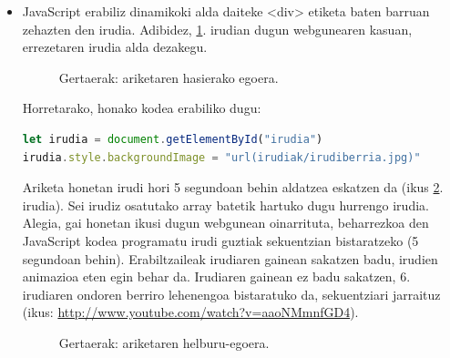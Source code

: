 \begin{itemize}
    \item JavaScript erabiliz dinamikoki alda daiteke <div> etiketa baten barruan zehazten den irudia. Adibidez, \ref{fig:gertaerak-ariketa-1}. irudian dugun webgunearen kasuan, errezetaren irudia alda dezakegu.
    
    \begin{figure}[ht]
	\centering
{}
\caption{Gertaerak: ariketaren hasierako egoera.}
\label{fig:gertaerak-ariketa-1}
\end{figure}

Horretarako, honako kodea erabiliko dugu:

\begin{lstlisting}[language=JavaScript,numbers=none]
let irudia = document.getElementById("irudia")
irudia.style.backgroundImage = "url(irudiak/irudiberria.jpg)"
\end{lstlisting}

Ariketa honetan irudi hori 5 segundoan behin aldatzea  eskatzen da (ikus \ref{fig:gertaerak-ariketa-2}. irudia). Sei irudiz osatutako array batetik hartuko dugu hurrengo irudia. Alegia, gai honetan ikusi dugun webgunean oinarrituta, beharrezkoa den JavaScript kodea programatu irudi guztiak sekuentzian bistaratzeko (5 segundoan behin). Erabiltzaileak irudiaren gainean sakatzen badu, irudien animazioa eten egin behar da. Irudiaren gainean ez badu sakatzen, 6. irudiaren ondoren berriro lehenengoa bistaratuko da, sekuentziari jarraituz (ikus: \href{http://www.youtube.com/watch?v=aaoNMmnfGD4}{http://www.youtube.com/watch?v=aaoNMmnfGD4}).

\begin{figure}[ht]
	\centering
{}
\caption{Gertaerak: ariketaren helburu-egoera.}
\label{fig:gertaerak-ariketa-2}
\end{figure}




\end{itemize}
